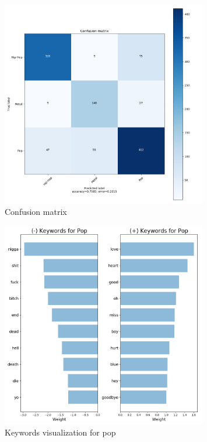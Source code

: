 \documentclass[a4paper,11pt]{article}
\begin{document}
\begin{figure}[h]
\begin{center}
\includegraphics[width=0.8\textwidth]{./img/matrix.png}
\end{center}
\caption{Confusion matrix}
\label{label-cf-matrix}
\end{figure}

\begin{figure}[h]
\begin{center}
\includegraphics[width=0.8\textwidth]{./img/pop-keywords.png}
\end{center}
\caption{Keywords visualization for pop}
\label{label-kw-pop}
\end{figure}
\end{document}

